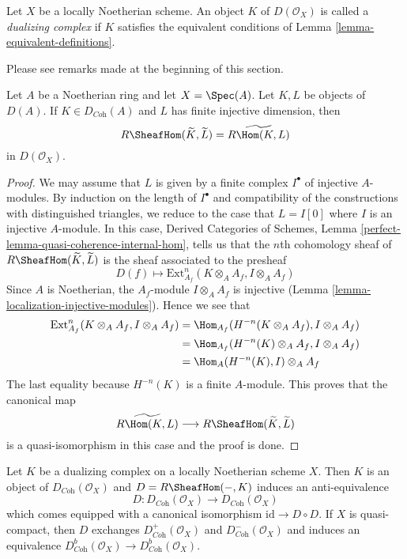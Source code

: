 \begin{definition}
\label{definition-dualizing-scheme}
Let $X$ be a locally Noetherian scheme. An object $K$ of
$D(\mathcal{O}_X)$ is called a {\it dualizing complex} if
$K$ satisfies the equivalent conditions of
Lemma \ref{lemma-equivalent-definitions}.
\end{definition}

\noindent
Please see remarks made at the beginning of this section.

\begin{lemma}
\label{lemma-affine-duality}
Let $A$ be a Noetherian ring and let $X = \Spec(A)$. Let $K, L$ be objects
of $D(A)$. If $K \in D_{\textit{Coh}}(A)$ and $L$ has finite injective
dimension, then
$$
R\SheafHom(\widetilde{K}, \widetilde{L})
=
\widetilde{R\Hom(K, L)}
$$
in $D(\mathcal{O}_X)$.
\end{lemma}

\begin{proof}
We may assume that $L$ is given by a finite complex $I^\bullet$
of injective $A$-modules. By induction on the length of $I^\bullet$
and compatibility of the constructions with distinguished triangles,
we reduce to the case that $L = I[0]$ where $I$ is an injective $A$-module.
In this case, Derived Categories of Schemes, Lemma
\ref{perfect-lemma-quasi-coherence-internal-hom}, tells us that
the $n$th cohomology sheaf of $R\SheafHom(\widetilde{K}, \widetilde{L})$
is the sheaf associated to the presheaf
$$
D(f) \longmapsto \text{Ext}^n_{A_f}(K \otimes_A A_f, I \otimes_A A_f)
$$
Since $A$ is Noetherian, the $A_f$-module $I \otimes_A A_f$ is injective
(Lemma \ref{lemma-localization-injective-modules}). Hence we see that
\begin{align*}
\text{Ext}^n_{A_f}(K \otimes_A A_f, I \otimes_A A_f)
& =
\Hom_{A_f}(H^{-n}(K \otimes_A A_f), I \otimes_A A_f) \\
& =
\Hom_{A_f}(H^{-n}(K) \otimes_A A_f, I \otimes_A A_f) \\
& =
\Hom_A(H^{-n}(K), I) \otimes_A A_f
\end{align*}
The last equality because $H^{-n}(K)$ is a finite $A$-module.
This proves that the canonical map
$$
\widetilde{R\Hom(K, L)}
\longrightarrow
R\SheafHom(\widetilde{K}, \widetilde{L})
$$
is a quasi-isomorphism in this case and the proof is done.
\end{proof}

\begin{lemma}
\label{lemma-dualizing-schemes}
Let $K$ be a dualizing complex on a locally Noetherian scheme $X$.
Then $K$ is an object of $D_{\textit{Coh}}(\mathcal{O}_X)$
and $D = R\SheafHom(-, K)$ induces an anti-equivalence
$$
D :
D_{\textit{Coh}}(\mathcal{O}_X)
\longrightarrow
D_{\textit{Coh}}(\mathcal{O}_X)
$$
which comes equipped with a canonical isomorphism
$\text{id} \to D \circ D$. If $X$ is quasi-compact, then
$D$ exchanges $D^+_{\textit{Coh}}(\mathcal{O}_X)$ and
$D^-_{\textit{Coh}}(\mathcal{O}_X)$ and induces an equivalence
$D^b_{\textit{Coh}}(\mathcal{O}_X) \to D^b_{\textit{Coh}}(\mathcal{O}_X)$.
\end{lemma}

